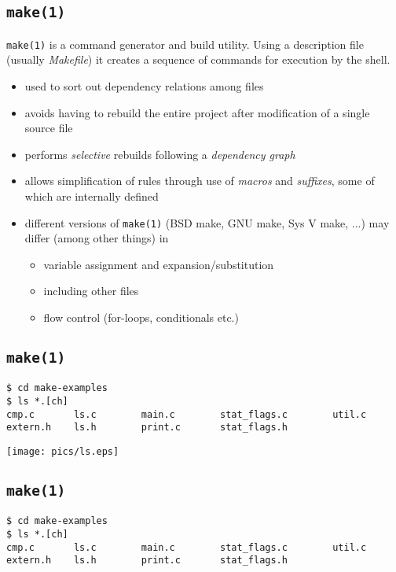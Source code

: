 \documentclass[xga]{xdvislides}
\begin{document}
\subsection{{\tt make(1)}}
{\tt make(1)} is a command generator and build utility. Using a
description file (usually {\em Makefile}) it creates a sequence of
commands for execution by the shell.

\begin{itemize}
	\item used to sort out dependency relations among files
	\item avoids having to rebuild the entire project after modification of a
		single source file
	\item performs {\em selective} rebuilds following a {\em dependency graph}
	\item allows simplification of rules through use of {\em macros} and {\em
		suffixes}, some of which are internally defined
	\item different versions of {\tt make(1)} (BSD make, GNU make, Sys V make,
		...) may differ (among other things) in
		\begin{itemize}
			\item variable assignment and expansion/substitution
			\item including other files
			\item flow control (for-loops, conditionals etc.)
		\end{itemize}
\end{itemize}

\subsection{{\tt make(1)}}

\begin{verbatim}
$ cd make-examples
$ ls *.[ch]
cmp.c       ls.c        main.c        stat_flags.c        util.c
extern.h    ls.h        print.c       stat_flags.h
\end{verbatim}

\begin{center}
	\texttt{[image: pics/ls.eps]}
\end{center}

\subsection{{\tt make(1)}}

\begin{verbatim}
$ cd make-examples
$ ls *.[ch]
cmp.c       ls.c        main.c        stat_flags.c        util.c
extern.h    ls.h        print.c       stat_flags.h
\end{verbatim}
\end{document}
